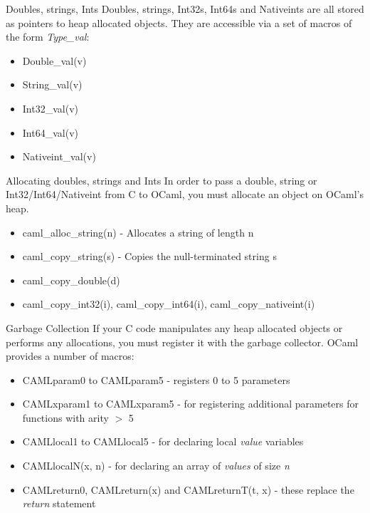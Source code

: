 \documentclass{beamer}
\begin{document}
\begin{frame}{Doubles, strings, Ints}
Doubles, strings, Int32s, Int64s and Nativeints are all stored as pointers to heap allocated objects.
They are accessible via a set of macros of the form \emph{Type\_val}:
\begin{itemize}
    \item Double\_val(v)
    \item String\_val(v)
    \item Int32\_val(v)
    \item Int64\_val(v)
    \item Nativeint\_val(v)
\end{itemize}
\end{frame}

\begin{frame}{Allocating doubles, strings and Ints}
In order to pass a double, string or Int32/Int64/Nativeint from C to OCaml, you must allocate an
object on OCaml's heap.
\begin{itemize}
    \item caml\_alloc\_string(n) - Allocates a string of length n
    \item caml\_copy\_string(s) - Copies the null-terminated string s
    \item caml\_copy\_double(d)
    \item caml\_copy\_int32(i), caml\_copy\_int64(i), caml\_copy\_nativeint(i)
\end{itemize}
\end{frame}

\begin{frame}{Garbage Collection}
If your C code manipulates any heap allocated objects or performs any allocations, you must
register it with the garbage collector.  OCaml provides a number of macros:
\begin{itemize}
    \item CAMLparam0 to CAMLparam5 - registers 0 to 5 parameters
    \item CAMLxparam1 to CAMLxparam5 - for registering additional parameters for functions with arity $>$ 5
    \item CAMLlocal1 to CAMLlocal5 - for declaring local \emph{value} variables
    \item CAMLlocalN(x, n) - for declaring an array of \emph{values} of size \emph{n}
    \item CAMLreturn0, CAMLreturn(x) and CAMLreturnT(t, x) - these replace the \emph{return} statement
\end{itemize}
\end{frame}
\end{document}
